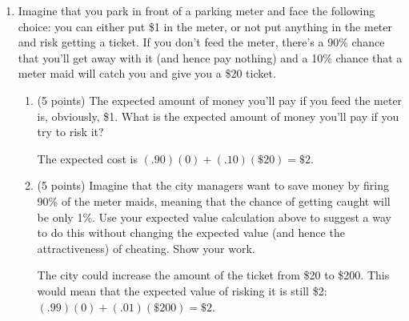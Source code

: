 \documentclass[twoside]{article}
\begin{document}
\begin{enumerate}
\begin{enumerate}
    \end{enumerate}







\item \begin{EXAM} Imagine that you park in front of a parking meter and face the following choice: you can either put \$1 in the meter, or not put anything in the meter and risk getting a ticket. If you don't feed the meter, there's a 90\% chance that you'll get away with it (and hence pay nothing) and a 10\% chance that a meter maid will catch you and give you a \$20 ticket. \end{EXAM}

    \begin{enumerate}

    \item \begin{EXAM} (5 points) The expected amount of money you'll pay if you feed the meter is, obviously, \$1. What is the expected amount of money you'll pay if you try to risk it? \clearpage \end{EXAM}

\begin{KEY}
The expected cost is $(.90)(0)+(.10)(\$20) = \$2$.
\end{KEY}

    \item \begin{EXAM} (5 points) Imagine that the city managers want to save money by firing 90\% of the meter maids, meaning that the chance of getting caught will be only 1\%. Use your expected value calculation above to suggest a way to do this without changing the expected value (and hence the attractiveness) of cheating. Show your work. \vspace{1in} \end{EXAM}

\begin{KEY}
The city could increase the amount of the ticket from \$20 to \$200. This would mean that the expected value of risking it is still \$2: $(.99)(0) + (.01)(\$200) = \$2$.
\end{KEY}

    \end{enumerate}













\end{enumerate}
\end{document}
